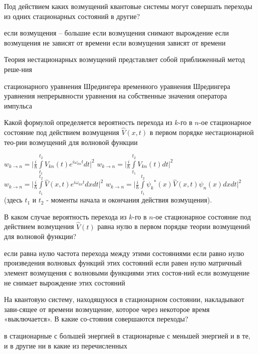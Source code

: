 \documentclass[11pt,a4paper]{exam}
\begin{document}
\begin{questions}


\question Под действием каких возмущений квантовые системы могут совершать переходы из одних стационарных состояний в другие?
\begin{choices}
\choice если возмущения – большие
\choice если возмущения снимают вырождение
\choice если возмущения не зависят от времени
\choice если возмущения зависят от времени 
\end{choices}

\question Теория нестационарных возмущений представляет собой приближенный метод реше-ния
\begin{choices}
\choice стационарного уравнения Шредингера
\choice временного уравнения Шредингера
\choice уравнения непрерывности
\choice уравнения на собственные значения оператора импульса
\end{choices}

\question  Какой формулой определяется вероятность перехода из $k$-го в $n$-ое стационарное состояние под действием возмущения $\hat V(x,t)$ в первом порядке нестационарной тео-рии возмущений для волновой функции
\begin{choices}
\choice ${w_{k \to n}} = |\frac{i}{\hbar }\int\limits_{{t_1}}^{{t_2}} {{V_{kn}}(t){e^{i{\omega _{kn}}t}}dt} {|^2}$     
\choice ${w_{k \to n}} = |\frac{i}{\hbar }\int\limits_{{t_1}}^{{t_2}} {{V_{kn}}(t)dt} {|^2}$   
\choice ${w_{k \to n}} = |\frac{i}{\hbar }\int\limits_{{t_1}}^{{t_2}} {\hat V(x,t){e^{i{\omega _{kn}}t}}dxdt} {|^2}$   
\choice ${w_{k \to n}} = |\frac{i}{\hbar }\int\limits_{{t_1}}^{{t_2}} {{\psi _k}^*(x)\hat V(x,t){\psi _n}(x)dxdt} {|^2}$
(здесь ${t_1}$ и ${t_2}$ - моменты начала и окончания действия возмущения).
\end{choices}

\question В каком случае вероятность перехода из $k$-го в $n$-ое стационарное состояние под действием возмущения $\hat V(t)$ равна нулю в первом порядке теории возмущений для волновой функции?
\begin{choices}
\choice если равна нулю частота перехода между этими состояниями
\choice если равно нулю произведения волновых функций этих состояний
\choice если равен нулю матричный элемент возмущения с волновыми функциями этих состоя-ний
\choice если возмущение не снимает вырождение этих состояний
\end{choices}

\question На квантовую систему, находящуюся в стационарном состоянии, накладывают зави-сящее от времени возмущение, которое через некоторое время «выключается». В какие со-стояния совершаются переходы?
\begin{choices}
\choice в стационарные с большей энергией
\choice в стационарные с меньшей энергией
\choice и в те, и в другие
\choice ни в какие из перечисленных
\end{choices}


\end{questions}
\end{document}
